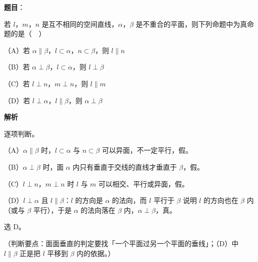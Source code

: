 \begin{answer}

\textbf{题目}：

若 $l$，$m$，$n$ 是互不相同的空间直线，$\alpha$，$\beta$ 是不重合的平面，则下列命题中为真命题的是（　）

（A）若 $\alpha\parallel\beta$，$l\subset\alpha$，$n\subset\beta$，则 $l\parallel n$

（B）若 $\alpha\perp\beta$，$l\subset\alpha$，则 $l\perp\beta$

（C）若 $l\perp n$，$m\perp n$，则 $l\parallel m$

（D）若 $l\perp\alpha$，$l\parallel\beta$，则 $\alpha\perp\beta$

\textbf{解析}

逐项判断。

（A）$\alpha\parallel\beta$ 时，$l\subset\alpha$ 与 $n\subset\beta$ 可以异面，不一定平行，假。

（B）$\alpha\perp\beta$ 时，面 $\alpha$ 内只有垂直于交线的直线才垂直于 $\beta$，假。

（C）$l\perp n$，$m\perp n$ 时 $l$ 与 $m$ 可以相交、平行或异面，假。

（D）$l\perp\alpha$ 且 $l\parallel\beta$：$l$ 的方向是 $\alpha$ 的法向，而 $l$ 平行于 $\beta$ 说明 $l$ 的方向也在 $\beta$ 内（或与 $\beta$ 平行），于是 $\alpha$ 的法向落在 $\beta$ 内，$\alpha\perp\beta$，真。

选 D。

（判断要点：面面垂直的判定要找「一个平面过另一个平面的垂线」；（D）中 $l\parallel\beta$ 正是把 $l$ 平移到 $\beta$ 内的依据。）


\end{answer}
